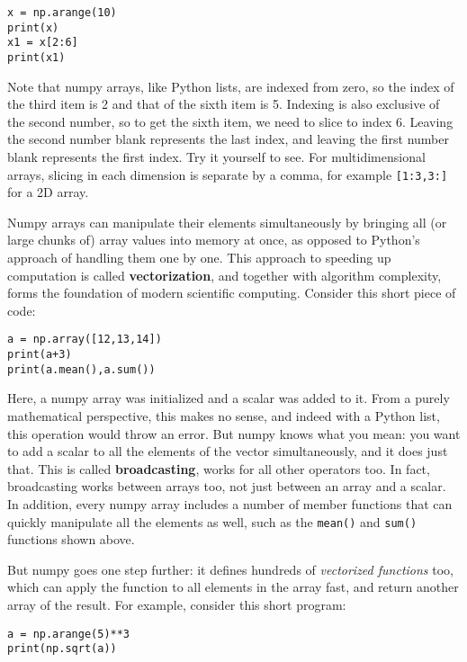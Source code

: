 \documentclass[12pt]{article}
\newcommand{\code}{\texttt}
\begin{document}
\begin{lstlisting}[frame=single] 
x = np.arange(10)
print(x)
x1 = x[2:6]
print(x1)
\end{lstlisting}

Note that numpy arrays, like Python lists, are indexed from zero, so the index of the third item is 2 and that of the sixth item is 5. Indexing is also exclusive of the second number, so to get the sixth item, we need to slice to index 6. Leaving the second number blank represents the last index, and leaving the first number blank represents the first index. Try it yourself to see. For multidimensional arrays, slicing in each dimension is separate by a comma, for example \code{[1:3,3:]} for a 2D array.

Numpy arrays can manipulate their elements simultaneously by bringing all (or large chunks of) array values into memory at once, as opposed to Python's approach of handling them one by one. This approach to speeding up computation is called \textbf{vectorization}, and together with algorithm complexity, forms the foundation of modern scientific computing. Consider this short piece of code:

\begin{lstlisting}[frame=single] 
a = np.array([12,13,14])
print(a+3)
print(a.mean(),a.sum())
\end{lstlisting}

Here, a numpy array was initialized and a scalar was added to it. From a purely mathematical perspective, this makes no sense, and indeed with a Python list, this operation would throw an error. But numpy knows what you mean: you want to add a scalar to all the elements of the vector simultaneously, and it does just that. This is called \textbf{broadcasting}, works for all other operators too. In fact, broadcasting works between arrays too, not just between an array and a scalar. In addition, every numpy array includes a number of member functions that can quickly manipulate all the elements as well, such as the \code{mean()} and \code{sum()} functions shown above.

But numpy goes one step further: it defines hundreds of \textit{vectorized functions} too, which can apply the function to all elements in the array fast, and return another array of the result. For example, consider this short program:

\begin{lstlisting}[frame=single] 
a = np.arange(5)**3
print(np.sqrt(a))
\end{lstlisting}
\end{document}
